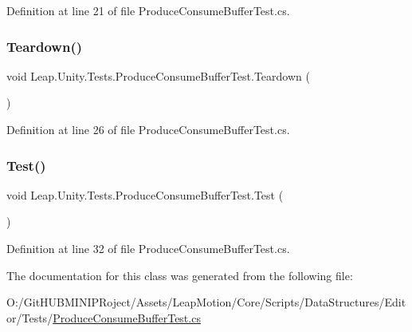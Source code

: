 Definition at line 21 of file Produce\+Consume\+Buffer\+Test.\+cs.

\mbox{\label{class_leap_1_1_unity_1_1_tests_1_1_produce_consume_buffer_test_a77c36eff139f3ba073d541663528b808}} 
\subsubsection{\texorpdfstring{Teardown()}{Teardown()}}
{\footnotesize\ttfamily void Leap.\+Unity.\+Tests.\+Produce\+Consume\+Buffer\+Test.\+Teardown (\begin{DoxyParamCaption}{ }\end{DoxyParamCaption})}



Definition at line 26 of file Produce\+Consume\+Buffer\+Test.\+cs.

\mbox{\label{class_leap_1_1_unity_1_1_tests_1_1_produce_consume_buffer_test_a3e45e3a47fd7e880a5ab1cbf7b8a57b7}} 
\subsubsection{\texorpdfstring{Test()}{Test()}}
{\footnotesize\ttfamily void Leap.\+Unity.\+Tests.\+Produce\+Consume\+Buffer\+Test.\+Test (\begin{DoxyParamCaption}{ }\end{DoxyParamCaption})}



Definition at line 32 of file Produce\+Consume\+Buffer\+Test.\+cs.



The documentation for this class was generated from the following file\+:\begin{DoxyCompactItemize}
\item 
O\+:/\+Git\+H\+U\+B\+M\+I\+N\+I\+P\+Roject/\+Assets/\+Leap\+Motion/\+Core/\+Scripts/\+Data\+Structures/\+Editor/\+Tests/\mbox{\hyperlink{_produce_consume_buffer_test_8cs}{Produce\+Consume\+Buffer\+Test.\+cs}}\end{DoxyCompactItemize}
